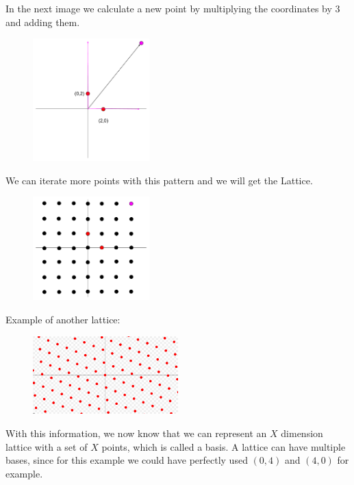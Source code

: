 In the next image we calculate a new point by multiplying the coordinates by 3
and adding them.

\begin{figure}[H]
    \centering
    \includegraphics[width=0.4\textwidth]{images/lattice1}
\end{figure}

We can iterate more points with this pattern and we will get the Lattice.

\begin{figure}[H]
    \centering
    \includegraphics[width=0.4\textwidth]{images/lattice2}
\end{figure}

Example of another lattice:

\begin{figure}[H]
    \centering
    \includegraphics[width=0.5\textwidth]{images/lattice3}
\end{figure}

With this information, we now know that we can represent an $X$ dimension
lattice with a set of $X$ points, which is called a basis. A lattice can have
multiple bases, since for this example we could have perfectly used $(0,4)$ and
$(4,0)$ for example.

